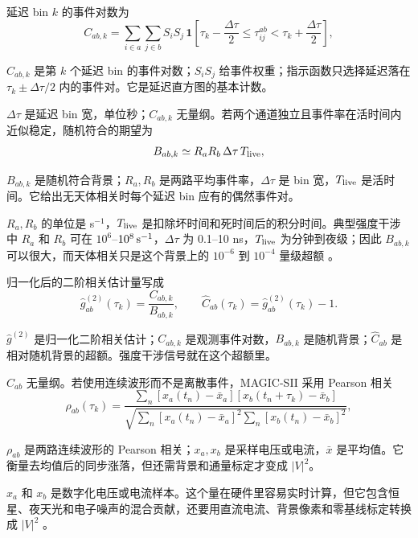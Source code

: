 延迟 bin \(k\) 的事件对数为
\begin{equation}
  C_{ab,k}
  =
  \sum_{i\in a}\sum_{j\in b}
  S_iS_j\,
  \mathbf{1}
  \left[
  \tau_k-\frac{\Delta\tau}{2}
  \le
  \tau_{ij}^{ab}
  <
  \tau_k+\frac{\Delta\tau}{2}
  \right],
  \label{eq:ch07-pair-count}
\end{equation}
\begin{formulaexplain}
\(C_{ab,k}\) 是第 \(k\) 个延迟 bin 的事件对数；\(S_iS_j\) 给事件权重；指示函数只选择延迟落在 \(\tau_k\pm\Delta\tau/2\) 内的事件对。它是延迟直方图的基本计数。
\end{formulaexplain}
\(\Delta\tau\) 是延迟 bin 宽，单位秒；\(C_{ab,k}\) 无量纲。若两个通道独立且事件率在活时间内近似稳定，随机符合的期望为
\begin{equation}
  B_{ab,k}
  \simeq
  R_a R_b\,\Delta\tau\,T_{\rm live},
  \label{eq:ch07-accidental}
\end{equation}
\begin{formulaexplain}
\(B_{ab,k}\) 是随机符合背景；\(R_a,R_b\) 是两路平均事件率，\(\Delta\tau\) 是 bin 宽，\(T_{\rm live}\) 是活时间。它给出无天体相关时每个延迟 bin 应有的偶然事件对。
\end{formulaexplain}
\(R_a,R_b\) 的单位是 s\(^{-1}\)，\(T_{\rm live}\) 是扣除坏时间和死时间后的积分时间。典型强度干涉中 \(R_a\) 和 \(R_b\) 可在 \(10^6\)--\(10^8\,{\rm s^{-1}}\)，\(\Delta\tau\) 为 0.1--10 ns，\(T_{\rm live}\) 为分钟到夜级；因此 \(B_{ab,k}\) 可以很大，而天体相关只是这个背景上的 \(10^{-6}\) 到 \(10^{-4}\) 量级超额 \citep{1974iiia.book.....H,2020NatAs...4.1164A,2024MNRAS.529.4387A}。

归一化后的二阶相关估计量写成
\begin{equation}
  \widehat{g}^{(2)}_{ab}(\tau_k)
  =
  \frac{C_{ab,k}}{B_{ab,k}},
  \qquad
  \widehat{C}_{ab}(\tau_k)
  =
  \widehat{g}^{(2)}_{ab}(\tau_k)-1.
  \label{eq:ch07-g2-estimator}
\end{equation}
\begin{formulaexplain}
\(\widehat g^{(2)}\) 是归一化二阶相关估计；\(C_{ab,k}\) 是观测事件对数，\(B_{ab,k}\) 是随机背景；\(\widehat C_{ab}\) 是相对随机背景的超额。强度干涉信号就在这个超额里。
\end{formulaexplain}
\(\widehat{C}_{ab}\) 无量纲。若使用连续波形而不是离散事件，MAGIC-SII 采用 Pearson 相关
\begin{equation}
  \rho_{ab}(\tau_k)
  =
  \frac{\sum_n
  \left[x_a(t_n)-\bar{x}_a\right]
  \left[x_b(t_n+\tau_k)-\bar{x}_b\right]}
  {\sqrt{\sum_n\left[x_a(t_n)-\bar{x}_a\right]^2
  \sum_n\left[x_b(t_n)-\bar{x}_b\right]^2}},
  \label{eq:ch07-pearson}
\end{equation}
\begin{formulaexplain}
\(\rho_{ab}\) 是两路连续波形的 Pearson 相关；\(x_a,x_b\) 是采样电压或电流，\(\bar x\) 是平均值。它衡量去均值后的同步涨落，但还需背景和通量标定才变成 \(|V|^2\)。
\end{formulaexplain}
\(x_a\) 和 \(x_b\) 是数字化电压或电流样本。这个量在硬件里容易实时计算，但它包含恒星、夜天光和电子噪声的混合贡献，还要用直流电流、背景像素和零基线标定转换成 \(|V|^2\) \citep{2024MNRAS.529.4387A}。

